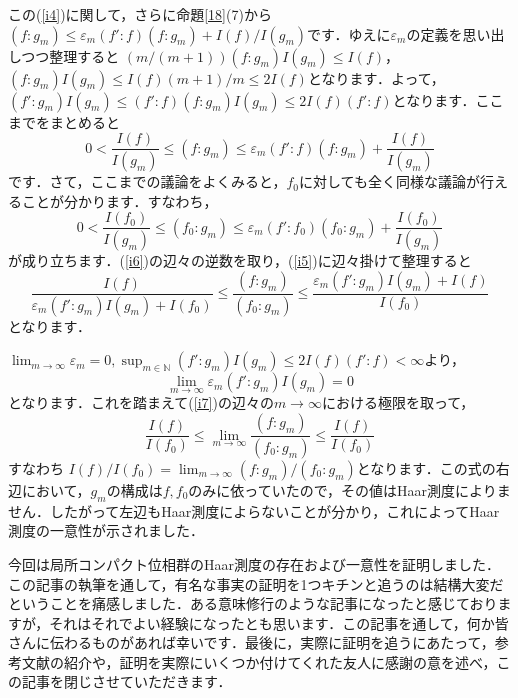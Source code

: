 \begin{Proof}
この(\ref{i4})に関して，さらに命題\ref{18}(7)から$\left( f \colon g_{m} \right) \le \varepsilon_{m} \left( f' \colon f \right) \left( f \colon g_{m} \right) + I(f)/I(g_{m})$です．ゆえに$\varepsilon_{m}$の定義を思い出しつつ整理すると $\left( m/(m+1) \right) \left( f \colon g_{m} \right)I(g_{m}) \le I(f)$，$\left( f \colon g_{m} \right)I(g_{m}) \le I(f)(m+1)/m \le 2I(f)$となります．よって，$ \left( f' \colon g_{m} \right)I(g_{m}) \le 
\left( f' \colon f \right) \left( f \colon g_{m} \right) I(g_{m}) \le 2I(f)\left( f' \colon f \right)$となります．ここまでをまとめると
\begin{equation}
0<\frac{I(f)}{I(g_{m})} \le \left( f \colon g_{m} \right) \le \varepsilon_{m} \left( f' \colon f \right) \left( f \colon g_{m} \right) + \frac{I(f)}{I(g_{m})}
\label{i5}
\end{equation}
です．さて，ここまでの議論をよくみると，$f_0$に対しても全く同様な議論が行えることが分かります．すなわち，
\begin{equation}
0<\frac{I(f_0)}{I(g_{m})} \le \left( f_0 \colon g_{m} \right) \le \varepsilon_{m} \left( f' \colon f_0 \right) \left( f_0 \colon g_{m} \right) +\frac{I(f_0)}{I(g_{m})}
\label{i6}
\end{equation}
が成り立ちます．(\ref{i6})の辺々の逆数を取り，(\ref{i5})に辺々掛けて整理すると
\begin{equation}
\frac{I(f)}{\varepsilon_{m} \left( f' \colon g_{m} \right)I(g_{m}) + I(f_0)} \le \frac{(f \colon g_{m}) }{(f_0 \colon g_{m})} \le \frac{ \varepsilon_{m} \left( f' \colon g_{m} \right)I(g_{m}) + I(f) }{I(f_0)}
\label{i7}
\end{equation}
となります．

$\lim_{m \to \infty}\varepsilon_{m} =0, \sup_{m \in \mathbb{N}}\left( f' \colon g_{m} \right)I(g_{m}) \le 2I(f)\left( f' \colon f \right) < \infty$より，
\[
\lim_{m \to \infty}\varepsilon_{m} \left( f' \colon g_{m} \right)I(g_{m})=0
\]
となります．これを踏まえて(\ref{i7})の辺々の$m \to \infty$における極限を取って，
\[
\frac{I(f)}{I(f_{0})} \le \lim_{m \to \infty} \frac{\left(f \colon g_{m} \right)}{\left( f_{0} \colon g_{m} \right)} \le \frac{I(f)}{I(f_{0})}
\]
すなわち $I(f)/I(f_{0})=\lim_{m \to \infty} \left( f \colon g_{m} \right) / \left( f_{0} \colon g_{m} \right)$となります．この式の右辺において，$g_{m}$の構成は$f, f_{0}$のみに依っていたので，その値はHaar測度によりません．したがって左辺もHaar測度によらないことが分かり，これによってHaar測度の一意性が示されました．　
\end{Proof}

今回は局所コンパクト位相群のHaar測度の存在および一意性を証明しました．この記事の執筆を通して，有名な事実の証明を1つキチンと追うのは結構大変だということを痛感しました．ある意味修行のような記事になったと感じておりますが，それはそれでよい経験になったとも思います．この記事を通して，何か皆さんに伝わるものがあれば幸いです．最後に，実際に証明を追うにあたって，参考文献の紹介や，証明を実際にいくつか付けてくれた友人に感謝の意を述べ，この記事を閉じさせていただきます．


